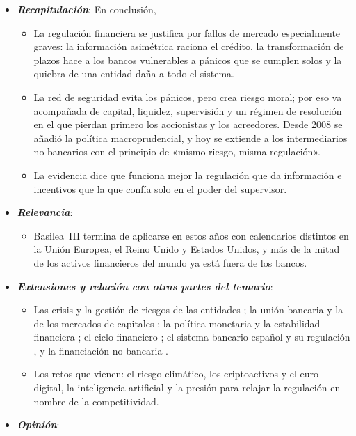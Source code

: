 \documentclass[11pt]{article}
\begin{document}
\begin{itemize}
\item \textbf{\emph{Recapitulación}}: En conclusión,
  \begin{itemize}
  \item La regulación financiera se justifica por fallos de mercado especialmente graves: la información asimétrica raciona el crédito, la transformación de plazos hace a los bancos vulnerables a pánicos que se cumplen solos y la quiebra de una entidad daña a todo el sistema.
  \item La red de seguridad evita los pánicos, pero crea riesgo moral; por eso va acompañada de capital, liquidez, supervisión y un régimen de resolución en el que pierdan primero los accionistas y los acreedores. Desde 2008 se añadió la política macroprudencial, y hoy se extiende a los intermediarios no bancarios con el principio de «mismo riesgo, misma regulación».
  \item La evidencia dice que funciona mejor la regulación que da información e incentivos que la que confía solo en el poder del supervisor.
  \end{itemize}
\item \textbf{\emph{Relevancia}}:
  \begin{itemize}
  \item Basilea~III termina de aplicarse en estos años con calendarios distintos en la Unión Europea, el Reino Unido y Estados Unidos, y más de la mitad de los activos financieros del mundo ya está fuera de los bancos.
  \end{itemize}
\item \textbf{\emph{Extensiones y relación con otras partes del temario}}:
  \begin{itemize}
  \item Las crisis y la gestión de riesgos de las entidades ; la unión bancaria y la de los mercados de capitales ; la política monetaria y la estabilidad financiera ; el ciclo financiero ; el sistema bancario español y su regulación , y la financiación no bancaria .
  \item Los retos que vienen: el riesgo climático, los criptoactivos y el euro digital, la inteligencia artificial y la presión para relajar la regulación en nombre de la competitividad.
  \end{itemize}
\item \textbf{\emph{Opinión}}:
  \begin{itemize}

\end{itemize}
\end{itemize}
\end{document}
